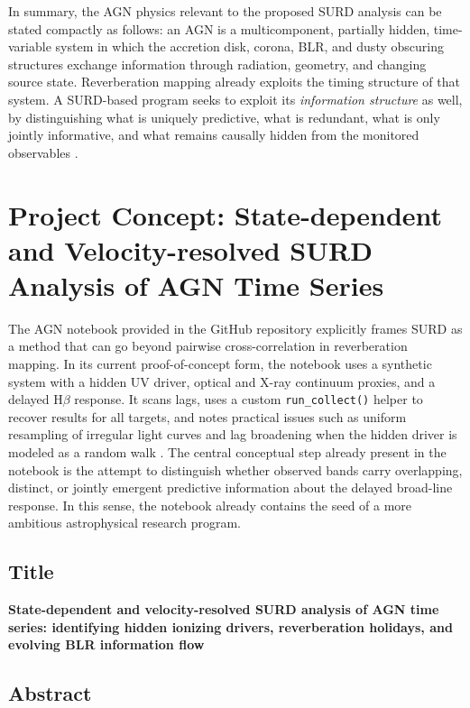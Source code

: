 \documentclass{article}
\begin{document}
In summary, the AGN physics relevant to the proposed SURD analysis can be stated compactly as follows: an AGN is a multicomponent, partially hidden, time-variable system in which the accretion disk, corona, BLR, and dusty obscuring structures exchange information through radiation, geometry, and changing source state. Reverberation mapping already exploits the timing structure of that system. A SURD-based program seeks to exploit its \emph{information structure} as well, by distinguishing what is uniquely predictive, what is redundant, what is only jointly informative, and what remains causally hidden from the monitored observables \cite{AGN_SURD_notebook,Cackett2021,Peterson2006,Netzer2015}.



\section{Project Concept: State-dependent and Velocity-resolved SURD Analysis of AGN Time Series}
\label{sec:project_concept_surd_agn}

The AGN notebook provided in the GitHub repository explicitly frames SURD as a method that can go beyond pairwise cross-correlation in reverberation mapping. In its current proof-of-concept form, the notebook uses a synthetic system with a hidden UV driver, optical and X-ray continuum proxies, and a delayed H$\beta$ response. It scans lags, uses a custom \texttt{run\_collect()} helper to recover results for all targets, and notes practical issues such as uniform resampling of irregular light curves and lag broadening when the hidden driver is modeled as a random walk \cite{AGN_SURD_notebook}. The central conceptual step already present in the notebook is the attempt to distinguish whether observed bands carry overlapping, distinct, or jointly emergent predictive information about the delayed broad-line response. In this sense, the notebook already contains the seed of a more ambitious astrophysical research program.

\subsection{Title}

\textbf{State-dependent and velocity-resolved SURD analysis of AGN time series: identifying hidden ionizing drivers, reverberation holidays, and evolving BLR information flow}

\subsection{Abstract}
\end{document}
